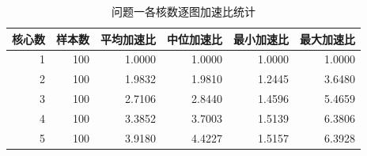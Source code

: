 \begin{table}[htbp]
\caption{问题一各核数逐图加速比统计}\label{tab:q1_mean}
\centering\normalsize
\setlength{\tabcolsep}{5pt}
\begin{tabular}{rrrrrr}
\toprule
核心数 & 样本数 & 平均加速比 & 中位加速比 & 最小加速比 & 最大加速比 \\
\midrule
1 & 100 & 1.0000 & 1.0000 & 1.0000 & 1.0000 \\
2 & 100 & 1.9832 & 1.9810 & 1.2445 & 3.6480 \\
3 & 100 & 2.7106 & 2.8440 & 1.4596 & 5.4659 \\
4 & 100 & 3.3852 & 3.7003 & 1.5139 & 6.3806 \\
5 & 100 & 3.9180 & 4.4227 & 1.5157 & 6.3928 \\
\bottomrule
\end{tabular}
\end{table}

